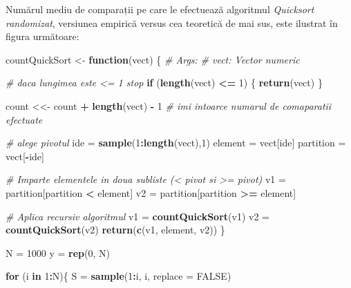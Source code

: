 \documentclass[]{article}
\newenvironment{Shaded}{\begin{snugshade}}{\end{snugshade}}
\newcommand{\KeywordTok}[1]{\textcolor[rgb]{0.13,0.29,0.53}{\textbf{#1}}}
\newcommand{\DataTypeTok}[1]{\textcolor[rgb]{0.13,0.29,0.53}{#1}}
\newcommand{\DecValTok}[1]{\textcolor[rgb]{0.00,0.00,0.81}{#1}}
\newcommand{\StringTok}[1]{\textcolor[rgb]{0.31,0.60,0.02}{#1}}
\newcommand{\CommentTok}[1]{\textcolor[rgb]{0.56,0.35,0.01}{\textit{#1}}}
\newcommand{\OtherTok}[1]{\textcolor[rgb]{0.56,0.35,0.01}{#1}}
\newcommand{\ControlFlowTok}[1]{\textcolor[rgb]{0.13,0.29,0.53}{\textbf{#1}}}
\newcommand{\OperatorTok}[1]{\textcolor[rgb]{0.81,0.36,0.00}{\textbf{#1}}}
\newcommand{\NormalTok}[1]{#1}
\begin{document}
Numărul mediu de comparații pe care le efectuează algoritmul
\emph{Quicksort randomizat}, versiunea empirică versus cea teoretică de
mai sus, este ilustrat în figura următoare:

\begin{Shaded}
\begin{Highlighting}[]
\NormalTok{countQuickSort <-}\StringTok{ }\ControlFlowTok{function}\NormalTok{(vect) \{}
  \CommentTok{# Args:}
  \CommentTok{#  vect: Vector numeric}
  
  \CommentTok{# daca lungimea este <= 1 stop}
  \ControlFlowTok{if}\NormalTok{ (}\KeywordTok{length}\NormalTok{(vect) }\OperatorTok{<=}\StringTok{ }\DecValTok{1}\NormalTok{) \{}
    \KeywordTok{return}\NormalTok{(vect)}
\NormalTok{  \}}
  
\NormalTok{  count <<-}\StringTok{ }\NormalTok{count }\OperatorTok{+}\StringTok{ }\KeywordTok{length}\NormalTok{(vect) }\OperatorTok{-}\StringTok{ }\DecValTok{1} \CommentTok{# imi intoarce numarul de comaparatii efectuate}
  
  \CommentTok{# alege pivotul}
\NormalTok{  ide =}\StringTok{ }\KeywordTok{sample}\NormalTok{(}\DecValTok{1}\OperatorTok{:}\KeywordTok{length}\NormalTok{(vect),}\DecValTok{1}\NormalTok{)}
\NormalTok{  element =}\StringTok{ }\NormalTok{vect[ide]}
\NormalTok{  partition =}\StringTok{ }\NormalTok{vect[}\OperatorTok{-}\NormalTok{ide]}
  
  \CommentTok{# Imparte elementele in doua subliste (< pivot si >= pivot)}
\NormalTok{  v1 =}\StringTok{ }\NormalTok{partition[partition }\OperatorTok{<}\StringTok{ }\NormalTok{element]}
\NormalTok{  v2 =}\StringTok{ }\NormalTok{partition[partition }\OperatorTok{>=}\StringTok{ }\NormalTok{element]}
  
  \CommentTok{# Aplica recursiv algoritmul}
\NormalTok{  v1 =}\StringTok{ }\KeywordTok{countQuickSort}\NormalTok{(v1)}
\NormalTok{  v2 =}\StringTok{ }\KeywordTok{countQuickSort}\NormalTok{(v2)}
  \KeywordTok{return}\NormalTok{(}\KeywordTok{c}\NormalTok{(v1, element, v2))}
\NormalTok{\}}

\NormalTok{N =}\StringTok{ }\DecValTok{1000}
\NormalTok{y =}\StringTok{ }\KeywordTok{rep}\NormalTok{(}\DecValTok{0}\NormalTok{, N)}

\ControlFlowTok{for}\NormalTok{ (i }\ControlFlowTok{in} \DecValTok{1}\OperatorTok{:}\NormalTok{N)\{}
\NormalTok{  S =}\StringTok{ }\KeywordTok{sample}\NormalTok{(}\DecValTok{1}\OperatorTok{:}\NormalTok{i, i, }\DataTypeTok{replace =} \OtherTok{FALSE}\NormalTok{)}
  

\end{Highlighting}
\end{Shaded}
\end{document}
